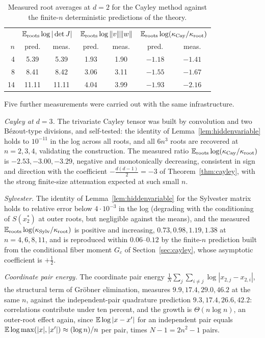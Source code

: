 \begin{table}[ht]
  \centering
  \begin{tabular}{r|cc|cc|cc}
    & \multicolumn{2}{c|}{$\mathbb{E}_{\mathrm{roots}}\log|\det J|$}
    & \multicolumn{2}{c|}{$\mathbb{E}_{\mathrm{roots}}\log\|v\|\|w\|$}
    & \multicolumn{2}{c}{$\mathbb{E}_{\mathrm{roots}}\log(\kappa_{\mathrm{Cay}}/\kappa_{\mathrm{root}})$} \\
    $n$ & pred. & meas. & pred. & meas. & pred. & meas. \\
    \hline
    4 & 5.39 & 5.39 & 1.93 & 1.90 & $-1.18$ & $-1.41$ \\
    8 & 8.41 & 8.42 & 3.06 & 3.11 & $-1.55$ & $-1.67$ \\
    14 & 11.11 & 11.11 & 4.04 & 3.99 & $-1.93$ & $-2.16$
  \end{tabular}
  \caption{Measured root averages at $d=2$ for the Cayley method against the finite-$n$
    deterministic predictions of the theory.}
  \label{tab:cayley}
\end{table}

Five further measurements were carried out with the same infrastructure.

\emph{Cayley at $d=3$.} The trivariate Cayley tensor was built by convolution and two
B\'ezout-type divisions, and self-tested: the identity of Lemma~\ref{lem:hiddenvariable}
holds to $10^{-11}$ in the log across all roots, and all $6n^3$ roots are recovered at
$n=2,3,4$, validating the construction. The measured ratio
$\mathbb{E}_{\mathrm{roots}}\log(\kappa_{\mathrm{Cay}}/\kappa_{\mathrm{root}})$ is $-2.53, -3.00, -3.29$, negative and
monotonically decreasing, consistent in sign and direction with the coefficient
$-\frac{d(d-1)}2 = -3$ of Theorem~\ref{thm:cayley}, with the strong finite-size
attenuation expected at such small $n$.

\emph{Sylvester.} The identity of Lemma~\ref{lem:hiddenvariable} for the Sylvester matrix
holds to relative error below $4\cdot10^{-3}$ in the log (degrading with the conditioning
of $S(x_2^*)$ at outer roots, but negligible against the means), and the measured
$\mathbb{E}_{\mathrm{roots}}\log(\kappa_{\mathrm{Sylv}}/\kappa_{\mathrm{root}})$ is positive and increasing,
$0.73, 0.98, 1.19, 1.38$ at $n=4,6,8,11$, and is reproduced within $0.06$--$0.12$ by the
finite-$n$ prediction built from the conditional fiber moment $G_c$ of
Section~\ref{sec:cayley}, whose asymptotic coefficient is $+\frac12$.

\emph{Coordinate pair energy.} The coordinate pair energy
$\frac1N\sum_j\sum_{i\ne j}\log|x_{2,j}-x_{2,i}|$, the structural term of Gr\"obner
elimination, measures $9.9, 17.4, 29.0, 46.2$ at the same $n$, against the
independent-pair quadrature prediction $9.3, 17.4, 26.6, 42.2$: correlations contribute
under ten percent, and the growth is $\Theta(n\log n)$, an outer-root effect again, since
$\mathbb{E}\log|x-x'|$ for an independent pair equals
$\mathbb{E}\log\max(|x|,|x'|)\approx(\log n)/n$ per pair, times $N-1 = 2n^2-1$ pairs.

